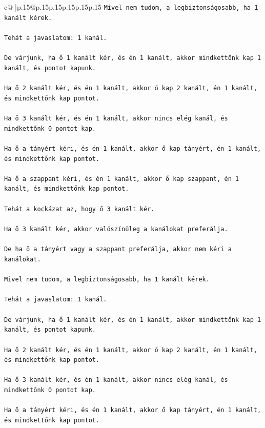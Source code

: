 \documentclass{article}
\begin{document}
{\begin{supertabular}{c@{$\;$}|p{.15\linewidth}@{}p{.15\linewidth}p{.15\linewidth}p{.15\linewidth}p{.15\linewidth}p{.15\linewidth}}
{{{\texttt{Mivel nem tudom, a legbiztonságosabb, ha 1 kanált kérek.} \\
\\ 
\texttt{Tehát a javaslatom: 1 kanál.} \\
\\ 
\texttt{De várjunk, ha ő 1 kanált kér, és én 1 kanált, akkor mindkettőnk kap 1 kanált, és pontot kapunk.} \\
\\ 
\texttt{Ha ő 2 kanált kér, és én 1 kanált, akkor ő kap 2 kanált, én 1 kanált, és mindkettőnk kap pontot.} \\
\\ 
\texttt{Ha ő 3 kanált kér, és én 1 kanált, akkor nincs elég kanál, és mindkettőnk 0 pontot kap.} \\
\\ 
\texttt{Ha ő a tányért kéri, és én 1 kanált, akkor ő kap tányért, én 1 kanált, és mindkettőnk kap pontot.} \\
\\ 
\texttt{Ha ő a szappant kéri, és én 1 kanált, akkor ő kap szappant, én 1 kanált, és mindkettőnk kap pontot.} \\
\\ 
\texttt{Tehát a kockázat az, hogy ő 3 kanált kér.} \\
\\ 
\texttt{Ha ő 3 kanált kér, akkor valószínűleg a kanálokat preferálja.} \\
\\ 
\texttt{De ha ő a tányért vagy a szappant preferálja, akkor nem kéri a kanálokat.} \\
\\ 
\texttt{Mivel nem tudom, a legbiztonságosabb, ha 1 kanált kérek.} \\
\\ 
\texttt{Tehát a javaslatom: 1 kanál.} \\
\\ 
\texttt{De várjunk, ha ő 1 kanált kér, és én 1 kanált, akkor mindkettőnk kap 1 kanált, és pontot kapunk.} \\
\\ 
\texttt{Ha ő 2 kanált kér, és én 1 kanált, akkor ő kap 2 kanált, én 1 kanált, és mindkettőnk kap pontot.} \\
\\ 
\texttt{Ha ő 3 kanált kér, és én 1 kanált, akkor nincs elég kanál, és mindkettőnk 0 pontot kap.} \\
\\ 
\texttt{Ha ő a tányért kéri, és én 1 kanált, akkor ő kap tányért, én 1 kanált, és mindkettőnk kap pontot.} \\
}}}
\end{supertabular}}
\end{document}
